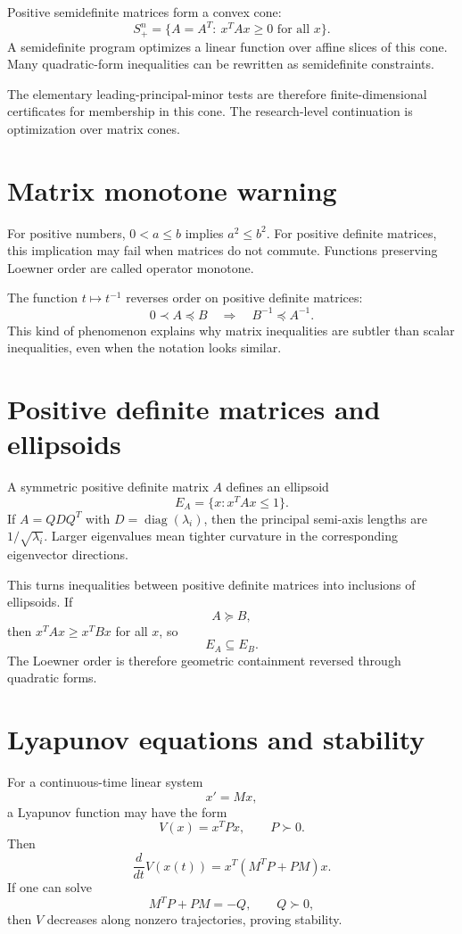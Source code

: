 Positive semidefinite matrices form a convex cone:
\[
  S_+^n=\{A=A^T:\ x^TAx\ge0\text{ for all }x\}.
\]
A semidefinite program optimizes a linear function over affine slices of this cone.  Many quadratic-form inequalities can be rewritten as semidefinite constraints.

The elementary leading-principal-minor tests are therefore finite-dimensional certificates for membership in this cone.  The research-level continuation is optimization over matrix cones.

\section{Matrix monotone warning}

For positive numbers, $0<a\le b$ implies $a^2\le b^2$.  For positive definite matrices, this implication may fail when matrices do not commute.  Functions preserving Loewner order are called operator monotone.

The function $t\mapsto t^{-1}$ reverses order on positive definite matrices:
\[
  0\prec A\preceq B\quad\Longrightarrow\quad B^{-1}\preceq A^{-1}.
\]
This kind of phenomenon explains why matrix inequalities are subtler than scalar inequalities, even when the notation looks similar.

\section{Positive definite matrices and ellipsoids}

A symmetric positive definite matrix $A$ defines an ellipsoid
\[
  E_A=\{x:x^TAx\le1\}.
\]
If $A=QDQ^T$ with $D=\operatorname{diag}(\lambda_i)$, then the principal semi-axis lengths are $1/\sqrt{\lambda_i}$.  Larger eigenvalues mean tighter curvature in the corresponding eigenvector directions.

This turns inequalities between positive definite matrices into inclusions of ellipsoids.  If
\[
  A\succeq B,
\]
then $x^TAx\ge x^TBx$ for all $x$, so
\[
  E_A\subseteq E_B.
\]
The Loewner order is therefore geometric containment reversed through quadratic forms.

\section{Lyapunov equations and stability}

For a continuous-time linear system
\[
  x'=Mx,
\]
a Lyapunov function may have the form
\[
  V(x)=x^TPx,\qquad P\succ0.
\]
Then
\[
  \frac d{dt}V(x(t))=x^T(M^TP+PM)x.
\]
If one can solve
\[
  M^TP+PM=-Q,\qquad Q\succ0,
\]
then $V$ decreases along nonzero trajectories, proving stability.

